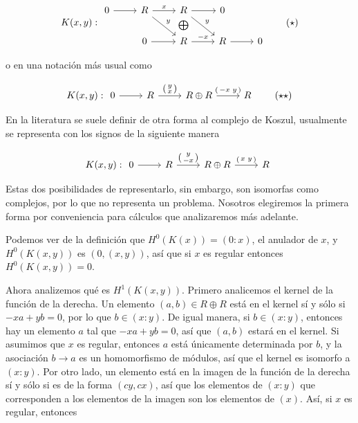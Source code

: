 \[
K(x,y):
\begin{tikzcd}
0\arrow[r,""] & R \arrow[r,"x"] \arrow[rd,"y"] & R \arrow[d,draw=none,"\bigoplus" description] \arrow[r,""] \arrow[rd,"y"] & 0\\
&0 \arrow[r,""] & R \arrow[r,"-x"] & R \arrow[r] & 0
\end{tikzcd} \label{complex2schema} \tag{$\star$}
\]

o en una notación más usual como 

\[
K(x,y):
\begin{tikzcd}[ampersand replacement=\&]
0 \ar[r] \& R \ar{r}{
\left( \begin{smallmatrix} y \\ x \end{smallmatrix} \right)
} \& R \oplus R \ar{r}{
\left( \begin{smallmatrix} -x & y \end{smallmatrix} \right)
} \& R
\end{tikzcd} \label{complex2common} \tag{$\star\star$}
\]

En la literatura se suele definir de otra forma al complejo de Koszul, usualmente se representa con los signos de la siguiente manera

\[
K(x,y):
\begin{tikzcd}[ampersand replacement=\&]
0 \ar[r] \& R \ar{r}{
\left( \begin{smallmatrix} y \\ -x \end{smallmatrix} \right)
} \& R \oplus R \ar{r}{
\left( \begin{smallmatrix} x & y \end{smallmatrix} \right)
} \& R
\end{tikzcd}
\]

Estas dos posibilidades de representarlo, sin embargo, son isomorfas como complejos, por lo que no representa un problema. Nosotros elegiremos la primera forma por conveniencia para cálculos que analizaremos más adelante.

Podemos ver de la definición que $H^0(K(x)) = (0:x)$, el anulador de $x$, y $H^0(K(x,y))$ es $(0, (x,y))$, así que si $x$ es regular entonces $H^0(K(x,y)) = 0$.

Ahora analizemos qué es $H^1(K(x,y))$. Primero analicemos el kernel de la función de la derecha. Un elemento $(a,b) \in R\oplus R$ está en el kernel sí y sólo si $-xa+yb = 0$, por lo que $b \in (x:y)$. De igual manera, si $b \in (x:y)$, entonces hay un elemento $a$ tal que $-xa + yb = 0$, así que $(a,b)$ estará en el kernel. Si asumimos que $x$ es regular, entonces $a$ está únicamente determinada por $b$, y la asociación $b\rightarrow a$ es un homomorfismo de módulos, así que el kernel es isomorfo a $(x:y)$.
Por otro lado, un elemento está en la imagen de la función de la derecha sí y sólo si es de la forma $(cy, cx)$, así que los elementos de $(x:y)$ que corresponden a los elementos de la imagen son los elementos de $(x)$. Así, si $x$ es regular, entonces

